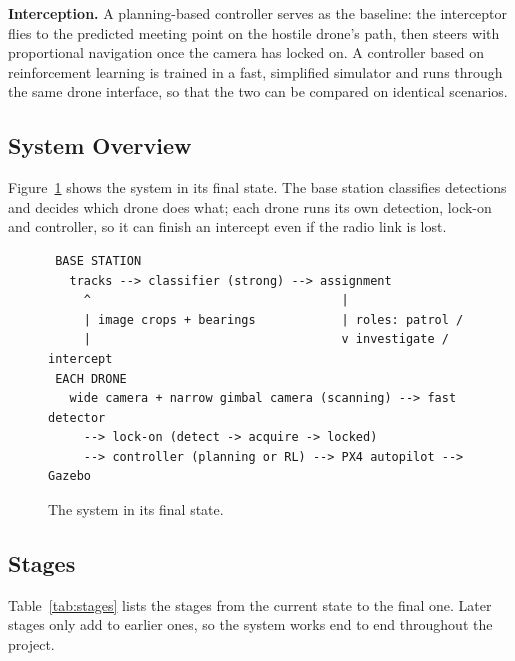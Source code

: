 \documentclass{article}
\begin{document}
\textbf{Interception.} A planning-based controller serves as the baseline: the
interceptor flies to the predicted meeting point on the hostile drone's path,
then steers with proportional navigation once the camera has locked on. A
controller based on reinforcement learning is trained in a fast, simplified
simulator and runs through the same drone interface, so that the two can be
compared on identical scenarios.

\subsection{System Overview}

Figure~\ref{fig:final-system} shows the system in its final state. The base
station classifies detections and decides which drone does what; each drone
runs its own detection, lock-on and controller, so it can finish an intercept
even if the radio link is lost.

\begin{figure}[H]
\centering
\small
\begin{verbatim}
 BASE STATION
   tracks --> classifier (strong) --> assignment
     ^                                   |
     | image crops + bearings            | roles: patrol /
     |                                   v investigate / intercept
 EACH DRONE
   wide camera + narrow gimbal camera (scanning) --> fast detector
     --> lock-on (detect -> acquire -> locked)
     --> controller (planning or RL) --> PX4 autopilot --> Gazebo
\end{verbatim}
\caption{The system in its final state.}
\label{fig:final-system}
\end{figure}

\subsection{Stages}
\label{sec:stages}

Table~\ref{tab:stages} lists the stages from the current state to the final
one. Later stages only add to earlier ones, so the system works end to end
throughout the project.
\end{document}
